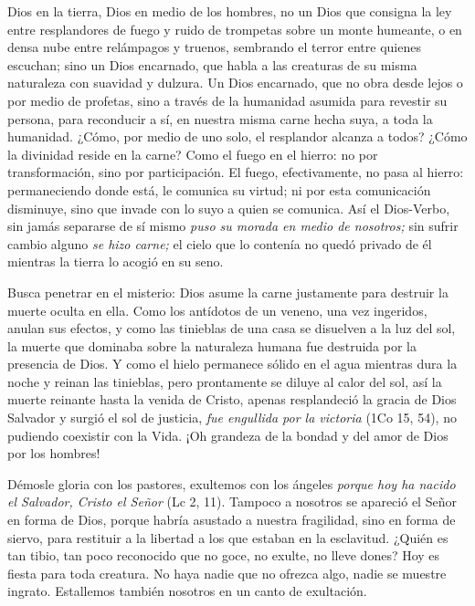 			\begin{body}
				Dios en la tierra, Dios en medio de los hombres, no un Dios que consigna la ley entre resplandores de fuego y ruido de trompetas sobre un monte humeante, o en densa nube entre relámpagos y truenos, sembrando el terror entre quienes escuchan; sino un Dios encarnado, que habla a las creaturas de su misma naturaleza con suavidad y dulzura. Un Dios encarnado, que no obra desde lejos o por medio de profetas, sino a través de la humanidad asumida para revestir su persona, para reconducir a sí, en nuestra misma carne hecha suya, a toda la humanidad. ¿Cómo, por medio de uno solo, el resplandor alcanza a todos? ¿Cómo la divinidad reside en la carne? Como el fuego en el hierro: no por transformación, sino por participación. El fuego, efectivamente, no pasa al hierro: permaneciendo donde está, le comunica su virtud; ni por esta comunicación disminuye, sino que invade con lo suyo a quien se comunica. Así el Dios-Verbo, sin jamás separarse de sí mismo \emph{puso su morada en medio de nosotros;} sin sufrir cambio alguno \emph{se hizo carne;} el cielo que lo contenía no quedó privado de él mientras la tierra lo acogió en su seno.
				
				Busca penetrar en el misterio: Dios asume la carne justamente para destruir la muerte oculta en ella. Como los antídotos de un veneno, una vez ingeridos, anulan sus efectos, y como las tinieblas de una casa se disuelven a la luz del sol, la muerte que dominaba sobre la naturaleza humana fue destruida por la presencia de Dios. Y como el hielo permanece sólido en el agua mientras dura la noche y reinan las tinieblas, pero prontamente se diluye al calor del sol, así la muerte reinante hasta la venida de Cristo, apenas resplandeció la gracia de Dios Salvador y surgió el sol de justicia, \emph{fue engullida por la victoria} (1Co 15, 54), no pudiendo coexistir con la Vida. ¡Oh grandeza de la bondad y del amor de Dios por los hombres!
				
				Démosle gloria con los pastores, exultemos con los ángeles \emph{porque hoy ha nacido el Salvador, Cristo el Señor} (Lc 2, 11). Tampoco a nosotros se apareció el Señor en forma de Dios, porque habría asustado a nuestra fragilidad, sino en forma de siervo, para restituir a la libertad a los que estaban en la esclavitud. ¿Quién es tan tibio, tan poco reconocido que no goce, no exulte, no lleve dones? Hoy es fiesta para toda creatura. No haya nadie que no ofrezca algo, nadie se muestre ingrato. Estallemos también nosotros en un canto de exultación.
			\end{body}


